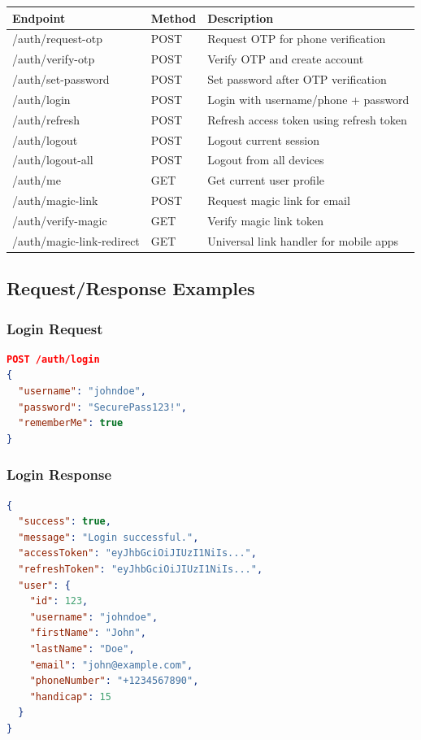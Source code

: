 \documentclass[12pt,a4paper]{article}
\begin{document}
\begin{longtable}{|p{3cm}|p{2cm}|p{8cm}|}
\hline
\textbf{Endpoint} & \textbf{Method} & \textbf{Description} \\
\hline
\endhead

/auth/request-otp & POST & Request OTP for phone verification \\
\hline
/auth/verify-otp & POST & Verify OTP and create account \\
\hline
/auth/set-password & POST & Set password after OTP verification \\
\hline
/auth/login & POST & Login with username/phone + password \\
\hline
/auth/refresh & POST & Refresh access token using refresh token \\
\hline
/auth/logout & POST & Logout current session \\
\hline
/auth/logout-all & POST & Logout from all devices \\
\hline
/auth/me & GET & Get current user profile \\
\hline
/auth/magic-link & POST & Request magic link for email \\
\hline
/auth/verify-magic & GET & Verify magic link token \\
\hline
/auth/magic-link-redirect & GET & Universal link handler for mobile apps \\
\hline

\end{longtable}

\subsection{Request/Response Examples}

\subsubsection{Login Request}
\begin{lstlisting}[language=json]
POST /auth/login
{
  "username": "johndoe",
  "password": "SecurePass123!",
  "rememberMe": true
}
\end{lstlisting}

\subsubsection{Login Response}
\begin{lstlisting}[language=json]
{
  "success": true,
  "message": "Login successful.",
  "accessToken": "eyJhbGciOiJIUzI1NiIs...",
  "refreshToken": "eyJhbGciOiJIUzI1NiIs...",
  "user": {
    "id": 123,
    "username": "johndoe",
    "firstName": "John",
    "lastName": "Doe",
    "email": "john@example.com",
    "phoneNumber": "+1234567890",
    "handicap": 15
  }
}
\end{lstlisting}
\end{document}
